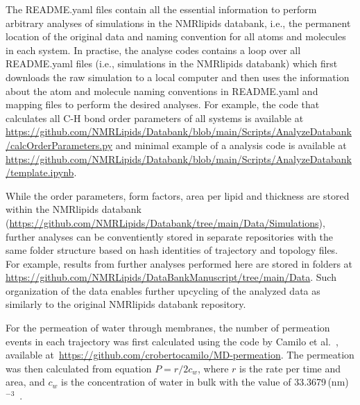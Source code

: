 \documentclass[fleqn,10pt]{wlscirep}
\begin{document}
The README.yaml files contain all the essential information to perform arbitrary analyses of simulations in the NMRlipids databank, i.e., the permanent location of the original data and naming convention for all atoms and molecules in each system. In practise, the analyse codes contains a loop over all README.yaml files (i.e., simulations in the NMRlipids databank) which first downloads the raw simulation to a local computer and then uses the information about the atom and molecule naming conventions in README.yaml and mapping files to perform the desired analyses. For example, the code that calculates all C-H bond order parameters of all systems is available at \url{https://github.com/NMRLipids/Databank/blob/main/Scripts/AnalyzeDatabank/calcOrderParameters.py} and minimal example of a analysis code is available at \url{https://github.com/NMRLipids/Databank/blob/main/Scripts/AnalyzeDatabank/template.ipynb}.

While the order parameters, form factors, area per lipid and thickness are stored within the NMRlipids databank (\url{https://github.com/NMRLipids/Databank/tree/main/Data/Simulations}), further analyses can be conventiently stored in separate repositories with the same folder structure based on hash identities of trajectory and topology files. For example, results from further analyses performed here are stored in folders at \url{https://github.com/NMRLipids/DataBankManuscript/tree/main/Data}. Such organization of the data enables further upcycling of the analyzed data as similarly to the original NMRlipids databank repository.

For the permeation of water through membranes, the number of permeation events in each trajectory was first calculated using the code by Camilo et al.~\cite{camilo2022}, available at~\url{https://github.com/crobertocamilo/MD-permeation}. The permeation was then calculated from equation $P=r/2c_w$, where $r$ is the rate per time and area, and $c_w$ is the concentration of water in bulk with the value of 33.3679\,(nm)$^{-3}$~\cite{venable19}.

\end{document}
